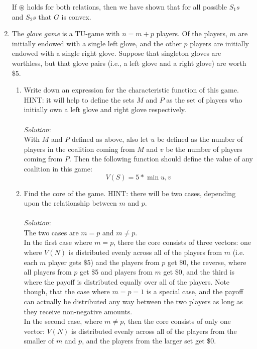 \documentclass{article}
\begin{document}
\begin{enumerate}
If $\circledast$ holds for both relations, then we have shown that for all possible $S_{1}s$ and $S_{2}s$ that $G$ is convex.

%
\hfill\newline
\item The \emph{glove game} is a TU-game with $n = m + p$ players. Of the players, $m$ are initially endowed with a single left glove, and the other $p$ players are initially endowed with a single right glove. Suppose that singleton gloves are worthless, but that glove pairs (i.e., a left glove and a right glove) are worth \$5.
    \begin{enumerate}
    \item Write down an expression for the characteristic function of this game. HINT: it will help to define the sets $M$ and $P$ as the set of players who initially own a left glove and right glove respectively. \\\\
    \textit{Solution}:\\
    With $M$ and $P$ defined as above, also let $u$ be defined as the number of players in the coalition coming from $M$ and $v$ be the number of players coming from $P$. Then the following function should define the value of any coalition in this game:
    $$ V(S) = 5 * \min u, v $$

    \item Find the core of the game. HINT: there will be two cases, depending upon the relationship between $m$ and $p$. \\\\
    \textit{Solution}:\\
    The two cases are $m = p$ and $m \neq p$. \\
    
    In the first case where $m = p$, there the core consists of three vectors: one where $V(N)$ is distributed evenly across all of the players from $m$ (i.e. each $m$ player gets \$5) and the players from $p$ get \$0, the reverse, where all players from $p$ get \$5 and players from $m$ get \$0, and the third is where the payoff is distributed equally over all of the players. Note though, that the case where $m = p = 1$ is a special case, and the payoff can actually be distributed any way between the two players as long as they receive non-negative amounts. \\

    In the second case, where $m \neq p$, then the core consists of only one vector: $V(N)$ is distributed evenly across all of the players from the smaller of $m$ and $p$, and the players from the larger set get \$0. \\


\end{enumerate}
\end{enumerate}
\end{document}
